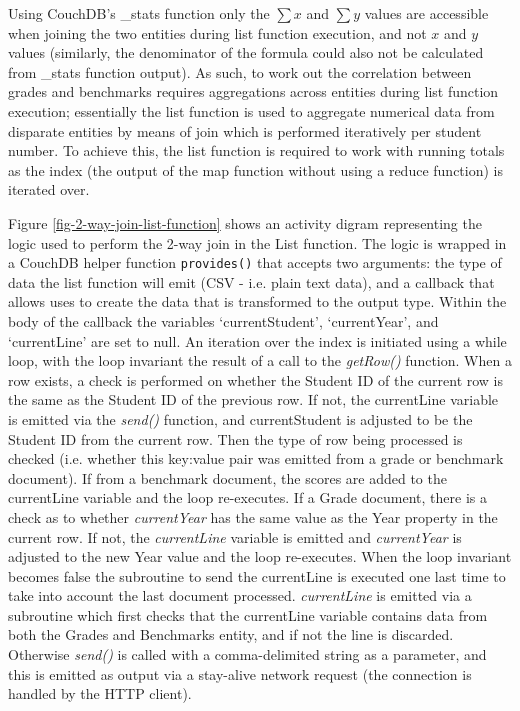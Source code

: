 Using CouchDB's \_stats function only the $\sum{x}$ and $\sum{y}$ values are accessible when joining the two entities during list function execution, and not $x$ and $y$ values (similarly, the denominator of the formula could also not be calculated from \_stats function output). As such, to work out the correlation between grades and benchmarks requires aggregations across entities during list function execution; essentially the list function is used to aggregate numerical data from disparate entities by means of join which is performed iteratively per student number. To achieve this, the list function is required to work with running totals as the index (the output of the map function without using a reduce function) is iterated over.





Figure \ref{fig-2-way-join-list-function} shows an activity digram representing the logic used to perform the 2-way join in the List function. The logic is wrapped in a CouchDB helper function \texttt{provides()} that accepts two arguments: the type of data the list function will emit (CSV - i.e. plain text data), and a callback that allows uses to create the data that is transformed to the output type. Within the body of the callback the variables `currentStudent', `currentYear', and `currentLine' are set to null. An iteration over the index is initiated using a while loop, with the loop invariant the result of a call to the \textit{getRow()} function. When a row exists, a check is performed on whether the Student ID of the current row is the same as the Student ID of the previous row. If not, the currentLine variable is emitted via the \textit{send()} function, and currentStudent is adjusted to be the Student ID from the current row. Then the type of row being processed is checked (i.e. whether this key:value pair was emitted from a grade or benchmark document). If from a benchmark document, the scores are added to the currentLine variable and the loop re-executes. If a Grade document, there is a check as to whether \textit{currentYear} has the same value as the Year property in the current row. If not, the \textit{currentLine} variable is emitted and \textit{currentYear} is adjusted to the new Year value and the loop re-executes. When the loop invariant becomes false the subroutine to send the currentLine is executed one last time to take into account the last document processed. \textit{currentLine} is emitted via a subroutine which first checks that the currentLine variable contains data from both the Grades and Benchmarks entity, and if not the line is discarded. Otherwise \textit{send()} is called with a comma-delimited string as a parameter, and this is emitted as output via a stay-alive network request (the connection is handled by the HTTP client).

